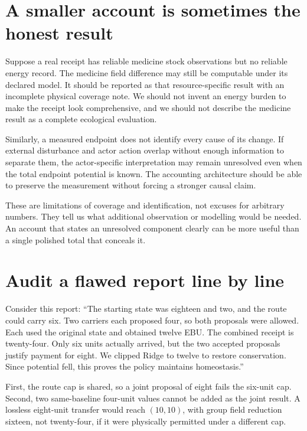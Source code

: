 \section{A smaller account is sometimes the honest result}

Suppose a real receipt has reliable medicine stock observations but no reliable energy record. The medicine field difference may still be computable under its declared model. It should be reported as that resource-specific result with an incomplete physical coverage note. We should not invent an energy burden to make the receipt look comprehensive, and we should not describe the medicine result as a complete ecological evaluation.

Similarly, a measured endpoint does not identify every cause of its change. If external disturbance and actor action overlap without enough information to separate them, the actor-specific interpretation may remain unresolved even when the total endpoint potential is known. The accounting architecture should be able to preserve the measurement without forcing a stronger causal claim.

These are limitations of coverage and identification, not excuses for arbitrary numbers. They tell us what additional observation or modelling would be needed. An account that states an unresolved component clearly can be more useful than a single polished total that conceals it.

\section{Audit a flawed report line by line}

Consider this report: ``The starting state was eighteen and two, and the route could carry six. Two carriers each proposed four, so both proposals were allowed. Each used the original state and obtained twelve EBU. The combined receipt is twenty-four. Only six units actually arrived, but the two accepted proposals justify payment for eight. We clipped Ridge to twelve to restore conservation. Since potential fell, this proves the policy maintains homeostasis.''

First, the route cap is shared, so a joint proposal of eight fails the six-unit cap. Second, two same-baseline four-unit values cannot be added as the joint result. A lossless eight-unit transfer would reach \((10,10)\), with group field reduction sixteen, not twenty-four, if it were physically permitted under a different cap.

